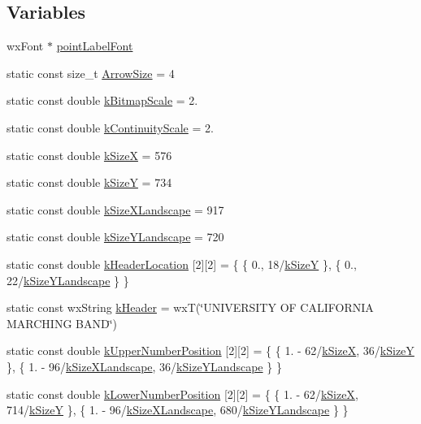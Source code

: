 \subsection*{Variables}
\begin{DoxyCompactItemize}
\item 
wx\-Font $\ast$ \hyperlink{a00222_aeaf4f1bd9c0b23a531be01a5bf2ae4e6}{point\-Label\-Font}
\item 
static const size\-\_\-t \hyperlink{a00222_a72b217e4c4e685e122228438065866e7}{Arrow\-Size} = 4
\item 
static const double \hyperlink{a00222_a7a3ea50920d637dcff6f9d4d2d9503d5}{k\-Bitmap\-Scale} = 2.
\item 
static const double \hyperlink{a00222_a66755ba8e00db497f31357a2dc71075a}{k\-Continuity\-Scale} = 2.
\item 
static const double \hyperlink{a00222_af38ec7276eab5e69e2b8b9b74c7e410d}{k\-Size\-X} = 576
\item 
static const double \hyperlink{a00222_a96b810fae104880234d8c31ca2b86416}{k\-Size\-Y} = 734
\item 
static const double \hyperlink{a00222_a6a5b0e2bab47c3fb6da928006951ed06}{k\-Size\-X\-Landscape} = 917
\item 
static const double \hyperlink{a00222_a2874803a217d546e2cc3fe8647bc8506}{k\-Size\-Y\-Landscape} = 720
\item 
static const double \hyperlink{a00222_af55bc4816db744c8a0559fabc09aa086}{k\-Header\-Location} \mbox{[}2\mbox{]}\mbox{[}2\mbox{]} = \{ \{ 0., 18/\hyperlink{a00222_a96b810fae104880234d8c31ca2b86416}{k\-Size\-Y} \}, \{ 0., 22/\hyperlink{a00222_a2874803a217d546e2cc3fe8647bc8506}{k\-Size\-Y\-Landscape} \} \}
\item 
static const wx\-String \hyperlink{a00222_af31a0bc1a0accdc64307e7beed9fe82b}{k\-Header} = wx\-T(\char`\"{}U\-N\-I\-V\-E\-R\-S\-I\-T\-Y O\-F C\-A\-L\-I\-F\-O\-R\-N\-I\-A M\-A\-R\-C\-H\-I\-N\-G B\-A\-N\-D\char`\"{})
\item 
static const double \hyperlink{a00222_a8c99bd57d6d85ae85596efe5d38394d1}{k\-Upper\-Number\-Position} \mbox{[}2\mbox{]}\mbox{[}2\mbox{]} = \{ \{ 1. -\/ 62/\hyperlink{a00222_af38ec7276eab5e69e2b8b9b74c7e410d}{k\-Size\-X}, 36/\hyperlink{a00222_a96b810fae104880234d8c31ca2b86416}{k\-Size\-Y} \}, \{ 1. -\/ 96/\hyperlink{a00222_a6a5b0e2bab47c3fb6da928006951ed06}{k\-Size\-X\-Landscape}, 36/\hyperlink{a00222_a2874803a217d546e2cc3fe8647bc8506}{k\-Size\-Y\-Landscape} \} \}
\item 
static const double \hyperlink{a00222_a85b639c5e342d65b45d37592e7ca9d9f}{k\-Lower\-Number\-Position} \mbox{[}2\mbox{]}\mbox{[}2\mbox{]} = \{ \{ 1. -\/ 62/\hyperlink{a00222_af38ec7276eab5e69e2b8b9b74c7e410d}{k\-Size\-X}, 714/\hyperlink{a00222_a96b810fae104880234d8c31ca2b86416}{k\-Size\-Y} \}, \{ 1. -\/ 96/\hyperlink{a00222_a6a5b0e2bab47c3fb6da928006951ed06}{k\-Size\-X\-Landscape}, 680/\hyperlink{a00222_a2874803a217d546e2cc3fe8647bc8506}{k\-Size\-Y\-Landscape} \} \}

\end{DoxyCompactItemize}
